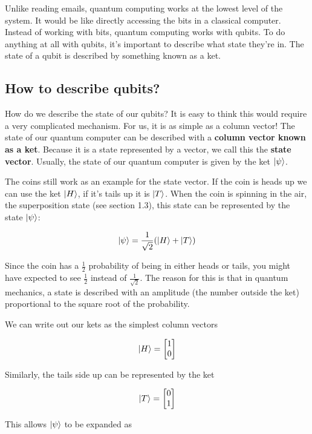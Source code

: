 \documentclass{book}
\begin{document}
Unlike reading emails, quantum computing works at the lowest level of the system. It would be like directly accessing the bits in a classical computer. Instead of working with bits, quantum computing works with qubits. To do anything at all with qubits, it's important to describe what state they're in. The state of a qubit is described by something known as a ket. 


\subsection{ How to describe qubits?}


How do we describe the state of our qubits? It is easy to think this would require a very complicated mechanism. For us, it is as simple as a column vector! The state of our quantum computer can be described with a \textbf{column vector known as a ket}. Because it is a state represented by a vector, we call this the \textbf{state vector}. Usually, the state of our quantum computer is given by the ket $\ket{\psi}$.

The coins still work as an example for the state vector. If the coin is heads up we can use the ket $\ket{H}$, if it's tails up it is $\ket{T}$. When the coin is spinning in the air, the superposition state (see section 1.3), this state can be represented by the state $\ket{\psi}$: 

$$
\ket{\psi} = \frac{1}{\sqrt{2}}(\ket{H} + \ket{T})
$$

Since the coin has a $\frac{1}{2}$ probability of being in either heads or tails, you might have expected to see $\frac{1}{2}$ instead of $\frac{1}{\sqrt{2}}$. The reason for this is that in quantum mechanics, a state is described with an amplitude (the number outside the ket) proportional to the square root of the probability. 

We can write out our kets as the simplest column vectors

$$ \ket{H} = 
\begin{bmatrix}
1 \\ 0
\end{bmatrix} $$

Similarly, the tails side up can be represented by the ket

$$
\ket{T} = 
\begin{bmatrix}
0 \\ 1
\end{bmatrix} $$

This allows $\ket{\psi} $ to be expanded as 
\end{document}
